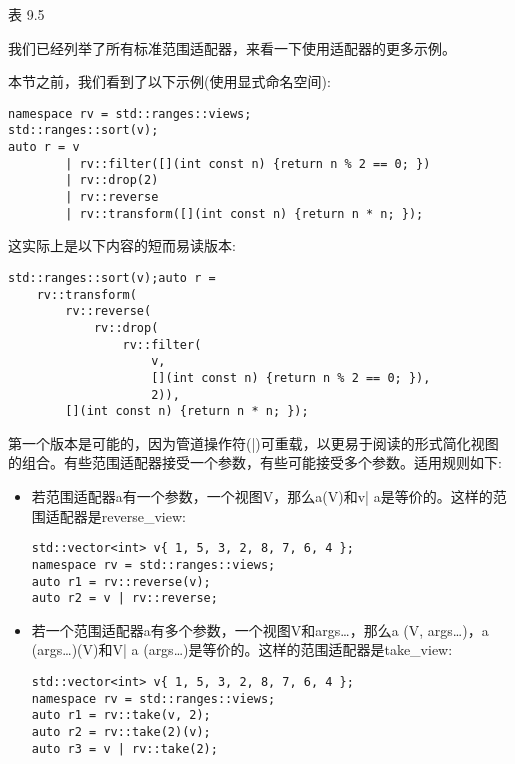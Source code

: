 \begin{center}
表 9.5
\end{center}

我们已经列举了所有标准范围适配器，来看一下使用适配器的更多示例。


本节之前，我们看到了以下示例(使用显式命名空间):

\begin{lstlisting}[style=styleCXX]
namespace rv = std::ranges::views;
std::ranges::sort(v);
auto r = v
		| rv::filter([](int const n) {return n % 2 == 0; })
		| rv::drop(2)
		| rv::reverse
		| rv::transform([](int const n) {return n * n; });
\end{lstlisting}

这实际上是以下内容的短而易读版本:

\begin{lstlisting}[style=styleCXX]
std::ranges::sort(v);auto r =
	rv::transform(
		rv::reverse(
			rv::drop(
				rv::filter(
					v,
					[](int const n) {return n % 2 == 0; }),
					2)),
		[](int const n) {return n * n; });
\end{lstlisting}

第一个版本是可能的，因为管道操作符(|)可重载，以更易于阅读的形式简化视图的组合。有些范围适配器接受一个参数，有些可能接受多个参数。适用规则如下:

\begin{itemize}
\item
若范围适配器a有一个参数，一个视图V，那么a(V)和v| a是等价的。这样的范围适配器是reverse\_view:

\begin{lstlisting}[style=styleCXX]
std::vector<int> v{ 1, 5, 3, 2, 8, 7, 6, 4 };
namespace rv = std::ranges::views;
auto r1 = rv::reverse(v);
auto r2 = v | rv::reverse;
\end{lstlisting}

\item
若一个范围适配器a有多个参数，一个视图V和args…，那么a (V, args…)，a (args…)(V)和V| a (args…)是等价的。这样的范围适配器是take\_view:

\begin{lstlisting}[style=styleCXX]
std::vector<int> v{ 1, 5, 3, 2, 8, 7, 6, 4 };
namespace rv = std::ranges::views;
auto r1 = rv::take(v, 2);
auto r2 = rv::take(2)(v);
auto r3 = v | rv::take(2);
\end{lstlisting}

\end{itemize}

